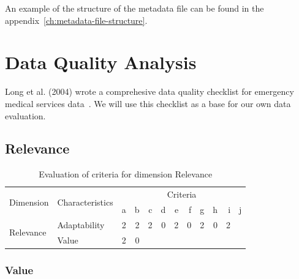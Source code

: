 An example of the structure of the metadata file can be found in the appendix~\ref{ch:metadata-file-structure}.

\section{Data Quality Analysis}

Long et al. (2004) wrote a comprehesive data quality checklist for emergency medical services data~\cite{long2004}.
We will use this checklist as a base for our own data evaluation.

\subsection{Relevance}

\begin{table}[htbp]
    \centering

    \begin{tabular}{llrrrrrrrrrr}
        \toprule
        \multirow{2}{*}{Dimension}  & \multirow{2}{*}{Characteristics}  & \multicolumn{10}{c}{Criteria}         \\ \cmidrule(lr){3-12}
                                    &                                   & a & b & c & d & e & f & g & h & i & j \\ \midrule
        \multirow{2}{*}{Relevance}  & Adaptability                      & 2 & 2 & 2 & 0 & 2 & 0 & 2 & 0 & 2 &   \\
                                    & Value                             & 2 & 0 &   &   &   &   &   &   &   &   \\
        \bottomrule
    \end{tabular}

    \caption{Evaluation of criteria for dimension Relevance}
    \label{table:relevance-benchmark}
\end{table}
\FloatBarrier

\subsubsection{Value}

